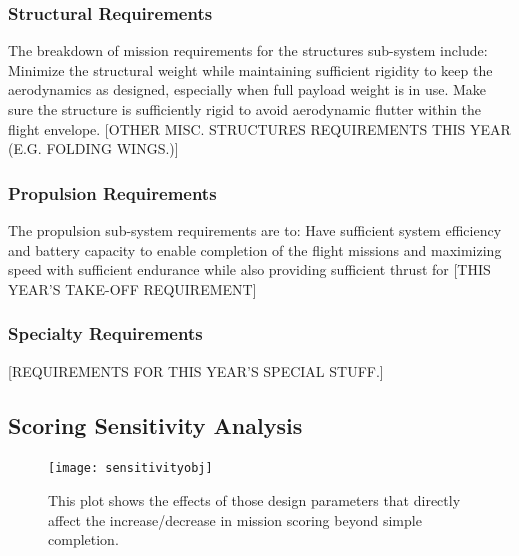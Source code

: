 \documentclass[report]{byu-aero}
\begin{document}
\subsubsection{Structural Requirements}
\label{sssec:StructuralReqs}

The breakdown of mission requirements for the structures sub-system include: Minimize the structural weight while maintaining sufficient rigidity to keep the aerodynamics as designed, especially when full payload weight is in use.  Make sure the structure is sufficiently rigid to avoid aerodynamic flutter within the flight envelope. {\color{BYUred}[OTHER MISC. STRUCTURES REQUIREMENTS THIS YEAR (E.G. FOLDING WINGS.)]}

\subsubsection{Propulsion Requirements}
\label{sssec:PropulsionReqs}

The propulsion sub-system requirements are to: Have sufficient system efficiency and battery capacity to enable completion of the flight missions and maximizing speed with sufficient endurance while also providing sufficient thrust for {\color{BYUred}[THIS YEAR'S TAKE-OFF REQUIREMENT]}

\subsubsection{Specialty Requirements} %
\label{sssec:SpecialReqs}

{\color{BYUred}[REQUIREMENTS FOR THIS YEAR'S SPECIAL STUFF.]} 
\lipsum[2]




\subsection{Scoring Sensitivity Analysis}
\label{ssec:SensitivityStudy}

\begin{figure}[h!]
	\centering
		\texttt{[image: sensitivityobj]}
	\caption{This plot shows the effects of those design parameters that directly affect the increase/decrease in mission scoring beyond simple completion.}
	\label{fig:sensitivity}
\end{figure}
\end{document}
